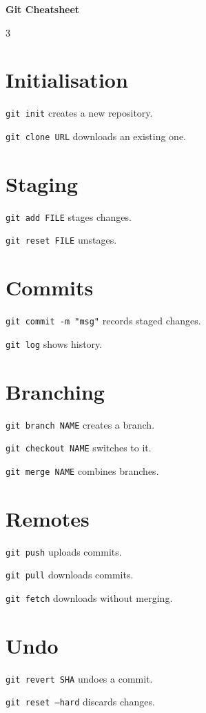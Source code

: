 \documentclass[landscape,10pt]{article}
\begin{document}
\begin{center}
\textbf{\Large Git Cheatsheet}
\end{center}

\begin{multicols}{3}

\section*{Initialisation}
\texttt{git init} creates a new repository.

\texttt{git clone URL} downloads an existing one.

\section*{Staging}
\texttt{git add FILE} stages changes.

\texttt{git reset FILE} unstages.

\section*{Commits}
\texttt{git commit -m "msg"} records staged changes.

\texttt{git log} shows history.

\section*{Branching}
\texttt{git branch NAME} creates a branch.

\texttt{git checkout NAME} switches to it.

\texttt{git merge NAME} combines branches.

\section*{Remotes}
\texttt{git push} uploads commits.

\texttt{git pull} downloads commits.

\texttt{git fetch} downloads without merging.

\section*{Undo}
\texttt{git revert SHA} undoes a commit.

\texttt{git reset --hard} discards changes.

\end{multicols}
\end{document}
